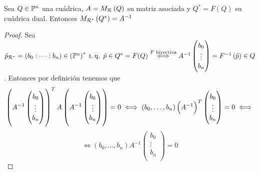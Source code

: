 \begin{prop}
  Sea $Q\in\mathbb{P}^n$ una cuádrica, $A=M_{\mathcal{R}}\left( Q\right)$ su matriz asociada y $Q^*=F(Q)$ su cuádrica dual.
   Entonces $M_{\mathcal{R}^*}\left( Q^* \right) = A^{-1}$
\end{prop}
\begin{proof}
  Sea $\tilde{p}_{\mathcal{R}^*}= \left( b_0:\dots:b_n\right) \in \left( \mathbb{P}^n \right) ^* \operatorname{\;t.q.\;} \tilde{p}\in Q^*=F(Q)
  \stackrel{F \text{ biyectiva}}{\iff} A^{-1}
  \begin{pmatrix}
   b_0\\
   \vdots\\
   b_n\\
  \end{pmatrix}=F^{-1}\left(\tilde{p}\right) \in Q$.
  Entonces por definición tenemos que 
  \[
   \left( A^{-1}
  \begin{pmatrix}
   b_0\\
   \vdots\\
   b_n\\
  \end{pmatrix}\right) ^T A \left( A^{-1}
  \begin{pmatrix}
   b_0\\
   \vdots\\
   b_n\\
  \end{pmatrix}\right)=0 \iff (b_0,\dots,b_n)\left( A^{-1}\right) ^T 
  \begin{pmatrix}
   b_0\\
   \vdots\\
   b_n\\
  \end{pmatrix}=0 \iff 
  \]
  \[
   \iff (b_0,\dots,b_n) A^{-1}
  \begin{pmatrix}
   b_0\\
   \vdots\\
   b_n\\
  \end{pmatrix}=0
  \]



\end{proof}












